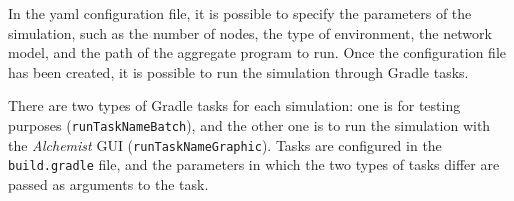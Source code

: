 In the yaml configuration file, it is possible to specify the parameters of the simulation, such as the number of nodes,
the type of environment, the network model, and the path of the aggregate program to run.
Once the configuration file has been created, it is possible to run the simulation through Gradle tasks.

There are two types of Gradle tasks for each simulation: one is for testing purposes (\texttt{runTaskNameBatch}), and the other
one is to run the simulation with the \emph{Alchemist} GUI (\texttt{runTaskNameGraphic}).
Tasks are configured in the \texttt{build.gradle} file, and the parameters in which the two types of tasks differ are
passed as arguments to the task.
